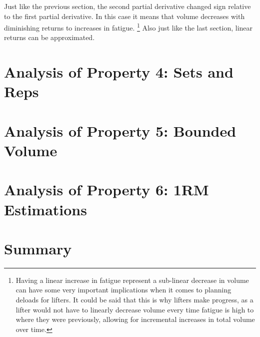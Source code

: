 Just like the previous section, the second partial derivative changed sign relative to the first partial derivative. In this case it means that volume decreases with diminishing returns to increases in fatigue. \footnote{Having a linear increase in fatigue represent a sub-linear decrease in volume can have some very important implications when it comes to planning deloads for lifters. It could be said that this is why lifters make progress, as a lifter would not have to linearly decrease volume every time fatigue is high to where they were previously, allowing for incremental increases in total volume over time.} Also just like the last section, linear returns can be approximated.


\section{Analysis of Property 4: Sets and Reps}
\label{sec:VolumeBasePotentialSurfaceProperty4}

\section{Analysis of Property 5: Bounded Volume}
\label{sec:VolumeBasePotentialSurfaceProperty5}

\section{Analysis of Property 6: 1RM Estimations}
\label{sec:VolumeBasePotentialSurfaceProperty6}

\section{Summary}
